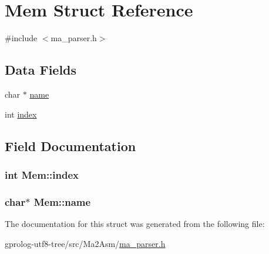 \hypertarget{structMem}{}\section{Mem Struct Reference}
\label{structMem}


{\ttfamily \#include $<$ma\+\_\+parser.\+h$>$}

\subsection*{Data Fields}
\begin{DoxyCompactItemize}
\item 
char $\ast$ \hyperlink{structMem_a97d3d596dc096d506a21a183f733ef5d}{name}
\item 
int \hyperlink{structMem_a496c7609b4591655a4acf6113a892c2d}{index}
\end{DoxyCompactItemize}


\subsection{Field Documentation}
\subsubsection[{\texorpdfstring{index}{index}}]{\setlength{\rightskip}{0pt plus 5cm}int Mem\+::index}\hypertarget{structMem_a496c7609b4591655a4acf6113a892c2d}{}\label{structMem_a496c7609b4591655a4acf6113a892c2d}
\subsubsection[{\texorpdfstring{name}{name}}]{\setlength{\rightskip}{0pt plus 5cm}char$\ast$ Mem\+::name}\hypertarget{structMem_a97d3d596dc096d506a21a183f733ef5d}{}\label{structMem_a97d3d596dc096d506a21a183f733ef5d}


The documentation for this struct was generated from the following file\+:\begin{DoxyCompactItemize}
\item 
gprolog-\/utf8-\/tree/src/\+Ma2\+Asm/\hyperlink{ma__parser_8h}{ma\+\_\+parser.\+h}\end{DoxyCompactItemize}

